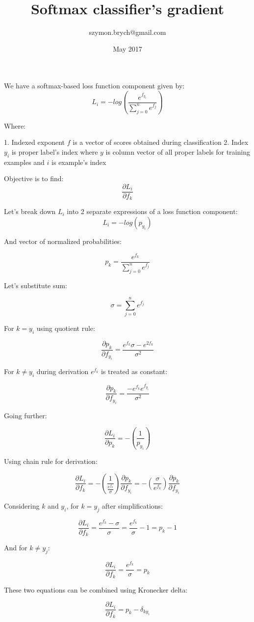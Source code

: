 \documentclass{article}
\title{Softmax classifier's gradient}
\author{szymon.brych@gmail.com }
\date{May 2017}
\begin{document}
\maketitle

We have a softmax-based loss function component given by:
$$L_i=-log\left(\frac{e^{f_{y_i}}}{\sum_{j=0}^ne^{f_j}}\right)$$

Where:

 1. Indexed exponent $f$ is a vector of scores obtained during classification
 2. Index $y_i$ is proper label's index where $y$ is column vector of all proper labels for training examples and $i$ is example's index

Objective is to find: $$\frac{\partial L_i}{\partial f_k}$$

Let's break down $L_i$ into 2 separate expressions of a loss function component:
$$L_i=-log(p_{y_i})$$

And vector of normalized probabilities:

$$p_k=\frac{e^{f_{k}}}{\sum_{j=0}^ne^{f_j}}$$

Let's substitute sum:

$$\sigma=\sum_{j=0}^ne^{f_j}$$

For $k={y_i}$ using quotient rule:

$$\frac{\partial p_k}{\partial f_{y_i}} = \frac{e^{f_k}\sigma-e^{2f_k}}{\sigma^2}$$

For $k\neq{y_i}$ during derivation $e^{f_k}$ is treated as constant:

$$\frac{\partial p_k}{\partial f_{y_i}} = \frac{-e^{f_k}e^{f_{y_i}}}{\sigma^2}$$

Going further:

$$\frac{\partial L_i}{\partial p_k}=-\left(\frac {1}{p_{y_i}}\right)$$

Using chain rule for derivation:

$$\frac{\partial L_i}{\partial f_k}=-\left(\frac {1}{\frac{e^{f_{k}}}{\sigma}}\right)\frac{\partial p_k}{\partial f_{y_i}}=-\left(\frac {\sigma}{{e^{f_{k}}}}\right)\frac{\partial p_k}{\partial f_{y_i}}$$

Considering $k$ and $y_i$, for $k=y_j$ after simplifications:

$$\frac{\partial L_i}{\partial f_k}=\frac{e^{f_k}-\sigma}{\sigma}=\frac{e^{f_k}}{\sigma}-1=p_k-1$$

And for $k\neq y_j$:

$$\frac{\partial L_i}{\partial f_k}=\frac{e^{f_k}}{\sigma}=p_k$$

These two equations can be combined using Kronecker delta:

$$\frac{\partial L_i}{\partial f_k}=p_k-\delta_{ky_i}$$
\end{document}
